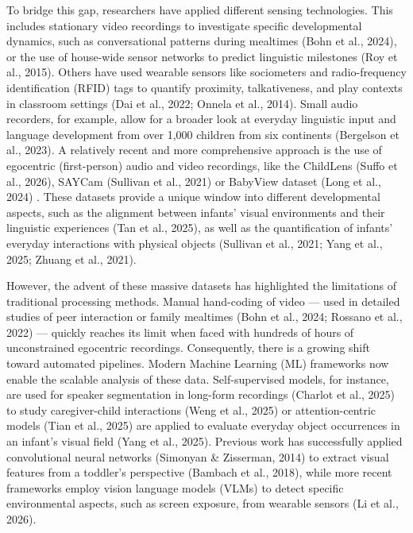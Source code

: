 \documentclass[
  english,
  12pt,
  man,floatsintext]{apa6}
\begin{document}
To bridge this gap, researchers have applied different sensing technologies. This includes stationary video recordings to investigate specific developmental dynamics, such as conversational patterns during mealtimes (Bohn et al., 2024), or the use of house-wide sensor networks to predict linguistic milestones (Roy et al., 2015). Others have used wearable sensors like sociometers and radio-frequency identification (RFID) tags to quantify proximity, talkativeness, and play contexts in classroom settings (Dai et al., 2022; Onnela et al., 2014). Small audio recorders, for example, allow for a broader look at everyday linguistic input and language development from over 1,000 children from six continents (Bergelson et al., 2023). A relatively recent and more comprehensive approach is the use of egocentric (first-person) audio and video recordings, like the ChildLens (Suffo et al., 2026), SAYCam (Sullivan et al., 2021) or BabyView dataset (Long et al., 2024) . These datasets provide a unique window into different developmental aspects, such as the alignment between infants' visual environments and their linguistic experiences (Tan et al., 2025), as well as the quantification of infants' everyday interactions with physical objects (Sullivan et al., 2021; Yang et al., 2025; Zhuang et al., 2021).

However, the advent of these massive datasets has highlighted the limitations of traditional processing methods. Manual hand-coding of video --- used in detailed studies of peer interaction or family mealtimes (Bohn et al., 2024; Rossano et al., 2022) --- quickly reaches its limit when faced with hundreds of hours of unconstrained egocentric recordings. Consequently, there is a growing shift toward automated pipelines. Modern Machine Learning (ML) frameworks now enable the scalable analysis of these data. Self-supervised models, for instance, are used for speaker segmentation in long-form recordings (Charlot et al., 2025) to study caregiver-child interactions (Weng et al., 2025) or attention-centric models (Tian et al., 2025) are applied to evaluate everyday object occurrences in an infant's visual field (Yang et al., 2025). Previous work has successfully applied convolutional neural networks (Simonyan \& Zisserman, 2014) to extract visual features from a toddler's perspective (Bambach et al., 2018), while more recent frameworks employ vision language models (VLMs) to detect specific environmental aspects, such as screen exposure, from wearable sensors (Li et al., 2026).
\end{document}
